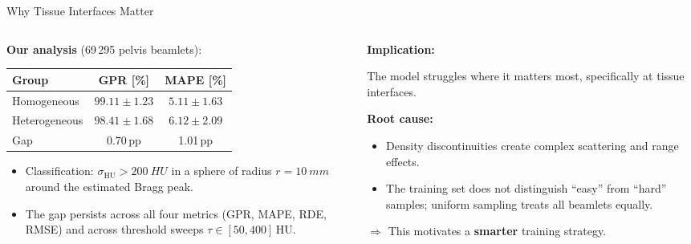 \documentclass[aspectratio=169, 10pt]{beamer}
\begin{document}
\begin{frame}{Why Tissue Interfaces Matter}
  \begin{columns}[T]
    \begin{column}{0.55\textwidth}
      \textbf{Our analysis} (69\,295 pelvis beamlets):

      \vspace{4pt}
      \begin{table}
        \centering\small
        \begin{tabular}{lcc}
          \toprule
          \textbf{Group} & \textbf{GPR [\%]} & \textbf{MAPE [\%]} \\
          \midrule
          Homogeneous  & $99.11 \pm 1.23$ & $5.11 \pm 1.63$ \\
          Heterogeneous & $98.41 \pm 1.68$ & $6.12 \pm 2.09$ \\
          \midrule
          Gap          & 0.70\,pp         & 1.01\,pp \\
          \bottomrule
        \end{tabular}
      \end{table}

      \vspace{4pt}
      \begin{itemize}\setlength{\itemsep}{2pt}
        \item Classification: $\sigma_{\text{HU}} > \SI{200}{HU}$
              in a sphere of radius $r = \SI{10}{mm}$ around the
              estimated Bragg peak.
        \item The gap persists across all four metrics (GPR, MAPE,
              RDE, RMSE) and across threshold sweeps
              $\tau \in [50, 400]$\,HU.
      \end{itemize}
    \end{column}
    \begin{column}{0.42\textwidth}
      \textbf{Implication:}

      \vspace{4pt}
      The model struggles where it matters most, specifically at tissue
      interfaces.

      \vspace{8pt}
      \textbf{Root cause:}
      \begin{itemize}\setlength{\itemsep}{3pt}
        \item Density discontinuities create complex scattering
              and range effects.
        \item The training set does not distinguish ``easy''
              from ``hard'' samples; uniform sampling treats
              all beamlets equally.
      \end{itemize}

      \vspace{8pt}
      {\small\color{tudelft} $\Rightarrow$ This motivates a
       \textbf{smarter} training strategy.}
    \end{column}
  \end{columns}
\end{frame}
\end{document}
